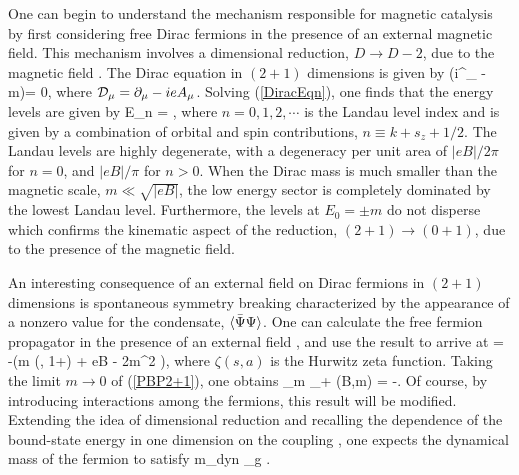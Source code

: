 \documentclass[aps,prd,twocolumn,showpacs,superscriptaddress,groupedaddress]{revtex4}  %
\begin{document}
One can begin to understand the mechanism responsible for magnetic catalysis by first considering free Dirac fermions in the presence of an external magnetic field. This mechanism involves a dimensional 
reduction, $D \to D-2$, due to the magnetic field \cite{Shovkovy}. The Dirac equation in $(2+1)$ dimensions is given by 
\beq
\label{DiracEqn}
(i\gamma^{\mu}\D_{\mu} - m)\Psi = 0,
\eeq
where ${\cal D}_{\mu} = \partial_{\mu} - ieA_{\mu}$.
Solving (\ref{DiracEqn}), one finds that the energy levels are given by 
\beq
\label{DiracEnergyLevels}
E_n = \pm {},
\eeq
where $n=0,1,2,\cdots$ is the Landau level index and is given by a combination of orbital and spin contributions, $n \equiv k + s_z + 1/2$. The Landau levels 
are highly degenerate, with a degeneracy per unit area of $|eB|/2\pi$ for $n=0$, and $|eB|/\pi$ for $n>0$. When the Dirac mass is much smaller than the magnetic scale, $m \ll \sqrt{|eB|}$, the low energy sector 
is completely dominated by the lowest Landau level. Furthermore, the levels at $E_0 = \pm m$ do not disperse which confirms the kinematic aspect of the reduction, $(2+1) \to (0+1)$, due to the presence of the magnetic field.

An interesting consequence of an external field on Dirac fermions in $(2+1)$ dimensions is spontaneous symmetry breaking characterized by the appearance of a nonzero value for the condensate, ${\langle {\bar \Psi} \Psi \rangle}$.
One can calculate the free fermion propagator in the presence of an external field \cite{Schwinger}, and use the result to arrive at \cite{DittrichGies, DittrichReuter}
\beq
\label{PBP2+1}
\vev{\Bpsi \Psi} = -\left(m  \zeta \left(, 1+\right) + eB - 2m^2 \right),
\eeq
where $\zeta(s,a)$ is the Hurwitz zeta function. Taking the limit $m \to 0$ of (\ref{PBP2+1}), one obtains
\beq
\label{PBP2+1Final}
\lim_{m _+} \vev{\Bpsi \Psi}(B,m) = -.
\eeq
Of course, by introducing interactions among the fermions, this result will be modified. Extending the idea of dimensional reduction and recalling the dependence of the bound-state energy in one dimension on the coupling \cite{LandauLifschitzQM}, one expects the dynamical mass of the fermion to satisfy 
\beq
\label{DynamicalMass}
m_{dyn} \propto \alpha_g .
\eeq

\end{document}
